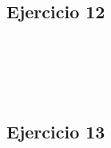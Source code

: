 \documentclass[10pt,a4paper]{article}
\begin{document}
\subsection{Ejercicio 12}
\subsubsection{}
    \begin{lstlisting}
    \end{lstlisting}
\subsubsection{}
    \begin{lstlisting}
    \end{lstlisting}
\subsubsection{}
    \begin{lstlisting}
    \end{lstlisting}
\subsubsection{}
    \begin{lstlisting}
    \end{lstlisting}
\subsection{Ejercicio 13}
\subsubsection{}
    \begin{lstlisting}
    \end{lstlisting}
\subsubsection{}
    \begin{lstlisting}
    \end{lstlisting}
\subsubsection{}
    \begin{lstlisting}
    \end{lstlisting}
\subsubsection{}
    \begin{lstlisting}
    \end{lstlisting}
\subsubsection{}
    \begin{lstlisting}
    \end{lstlisting}
\subsubsection{}
    \begin{lstlisting}
    \end{lstlisting}
\end{document}
